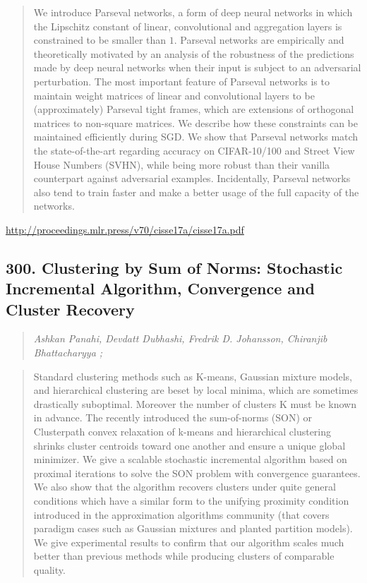 \documentclass{article}
\begin{document}
\begin{quote}
    We introduce Parseval networks, a form of deep neural networks in which the Lipschitz constant of linear, convolutional and aggregation layers is constrained to be smaller than $1$. Parseval networks are empirically and theoretically motivated by an analysis of the robustness of the predictions made by deep neural networks when their input is subject to an adversarial perturbation. The most important feature of Parseval networks is to maintain weight matrices of linear and convolutional layers to be (approximately) Parseval tight frames, which are extensions of orthogonal matrices to non-square matrices. We describe how these constraints can be maintained efficiently during SGD. We show that Parseval networks match the state-of-the-art regarding accuracy on CIFAR-10/100 and Street View House Numbers (SVHN), while being more robust than their vanilla counterpart against adversarial examples. Incidentally, Parseval networks also tend to train faster and make a better usage of the full capacity of the networks.  
\end{quote}

\href{http://proceedings.mlr.press/v70/cisse17a/cisse17a.pdf}{http://proceedings.mlr.press/v70/cisse17a/cisse17a.pdf}

\subsection{300. Clustering by Sum of Norms: Stochastic Incremental Algorithm, Convergence and Cluster Recovery}

\begin{quote}
\footnotesize{\textit{Ashkan Panahi, Devdatt Dubhashi, Fredrik D. Johansson, Chiranjib Bhattacharyya ;}}

\end{quote}

\begin{quote}
    Standard clustering methods such as K-means, Gaussian mixture models, and hierarchical clustering are beset by local minima, which are sometimes drastically suboptimal. Moreover the number of clusters K must be known in advance. The recently introduced the sum-of-norms (SON) or Clusterpath convex relaxation of k-means and hierarchical clustering shrinks cluster centroids toward one another and ensure a unique global minimizer. We give a scalable stochastic incremental algorithm based on proximal iterations to solve the SON problem with convergence guarantees. We also show that the algorithm recovers clusters under quite general conditions which have a similar form to the unifying proximity condition introduced in the approximation algorithms community (that covers paradigm cases such as Gaussian mixtures and planted partition models). We give experimental results to confirm that our algorithm scales much better than previous methods while producing clusters of comparable quality.  
\end{quote}
\end{document}
